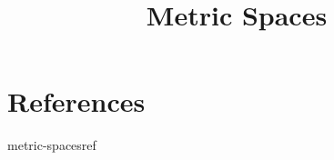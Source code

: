 \documentclass[preview]{standalone}
\begin{document}
\title{Metric Spaces}
\genpage

\nocite{*} %

\section{References}

\begin{snippet}{metric-spacesref}
\printbibliography[heading=none]
\end{snippet}
\end{document}
